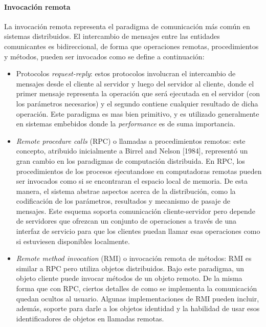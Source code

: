 \documentclass[a4paper,12pt, oneside]{article}
\begin{document}
\paragraph{Invocación remota}
La invocación remota representa el paradigma de comunicación más común en sistemas distribuidos. El intercambio de mensajes entre las entidades comunicantes es bidireccional, de forma que operaciones remotas, procedimientos y métodos, pueden ser invocados como se define a continuación:
\begin{itemize}
	\item Protocolos \textit{request-reply}: estos protocolos involucran el intercambio de mensajes desde el cliente al servidor y luego del servidor al cliente, donde el primer mensaje representa la operación que será ejecutada en el servidor (con los parámetros necesarios) y el segundo contiene cualquier resultado de dicha operación. Este paradigma es mas bien primitivo, y es utilizado generalmente en sistemas embebidos donde la \textit{performance} es de suma importancia.
	\item \textit{Remote procedure calls} (RPC) o llamadas a procedimientos remotos: este concepto, atribuido inicialmente a Birrel and Nelson [1984], representó un gran cambio en los paradigmas de computación distribuida. En RPC, los procedimientos de los procesos ejecutandose en computadoras remotas pueden ser invocados como si se encontraran el espacio local de memoria. De esta manera, el sistema abstrae aspectos acerca de la distribución, como la codificación de los parámetros, resultados y mecanismo de pasaje de  mensajes. Este esquema soporta comunicación cliente-servidor pero depende de servidores que ofrezcan un conjunto de operaciones a través de una interfaz de servicio para que los clientes puedan llamar esas operaciones como si estuviesen disponibles localmente.
	\item \textit{Remote method invocation} (RMI) o invocación remota de métodos: RMI es similar a RPC pero utiliza objetos distribuidos. Bajo este paradigma, un objeto cliente puede invocar métodos de un objeto remoto. De la misma forma que con RPC, ciertos detalles de como se implementa la comunicación quedan ocultos al usuario. Algunas implementaciones de RMI pueden incluir, además, soporte para darle a los objetos identidad y la habilidad de usar esos identificadores de objetos en llamadas remotas.
\end{itemize}
\end{document}
